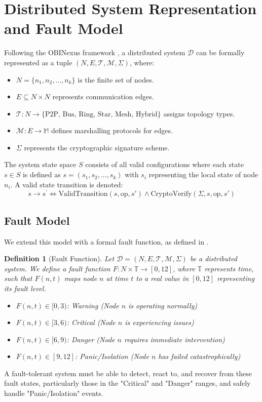 \documentclass[10pt]{article}
\newtheorem{definition}[theorem]{Definition
}
\begin{document}
\section{Distributed System Representation and Fault Model}
Following the OBINexus framework \cite{OBINexusFaultTolerance, OBINexusDataMarshalling}, a distributed system $\mathcal{D}$ can be formally represented as a tuple $(N, E, \mathcal{T}, \mathcal{M}, \Sigma)$, where:
\begin{itemize}
    \item $N=\{n_{1},n_{2},...,n_{k}\}$ is the finite set of nodes.
    \item $E\subseteq N\times N$ represents communication edges.
    \item $\mathcal{T}:N\rightarrow\{\text{P2P, Bus, Ring, Star, Mesh, Hybrid}\}$ assigns topology types.
    \item $\mathcal{M}:E\rightarrow\mathbb{M}$ defines marshalling protocols for edges.
    \item $\Sigma$ represents the cryptographic signature scheme.
\end{itemize}
The system state space $S$ consists of all valid configurations where each state $s\in S$ is defined as $s=(s_{1},s_{2},...,s_{k})$ with $s_{i}$ representing the local state of node $n_{i}$. A valid state transition is denoted:
$$s\longrightarrow s^{\prime}\Leftrightarrow \text{ValidTransition}(s, \text{op}, s') \land \text{CryptoVerify}(\Sigma, s, \text{op}, s')$$

\subsection{Fault Model}
We extend this model with a formal fault function, as defined in \cite{OBINexusFaultTolerance}.
\begin{definition}[Fault Function]
Let $\mathcal{D}=(N,E,\mathcal{T},\mathcal{M},\Sigma)$ be a distributed system. We define a fault function $F:N\times\mathbb{T}\rightarrow[0,12]$, where $\mathbb{T}$ represents time, such that $F(n,t)$ maps node $n$ at time $t$ to a real value in $[0, 12]$ representing its fault level.
\begin{itemize}
    \item $F(n,t)\in[0,3)$: Warning (Node $n$ is operating normally)
    \item $F(n,t)\in[3,6)$: Critical (Node $n$ is experiencing issues)
    \item $F(n,t)\in[6,9)$: Danger (Node $n$ requires immediate intervention)
    \item $F(n,t)\in[9,12]$: Panic/Isolation (Node $n$ has failed catastrophically)
\end{itemize}
\end{definition}
A fault-tolerant system must be able to detect, react to, and recover from these fault states, particularly those in the "Critical" and "Danger" ranges, and safely handle "Panic/Isolation" events.
\end{document}
